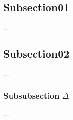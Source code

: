     \subsection{Subsection01}
    ...

    \subsection{Subsection02}
    ...

    \subsubsection{Subsubsection $\Delta$}
    ...
